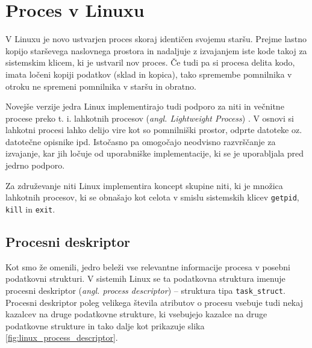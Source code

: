 \documentclass[a4paper,12pt,openright]{book}
\begin{document}
\section{Proces v Linuxu}

V Linuxu je novo ustvarjen proces skoraj identičen svojemu staršu.
Prejme lastno kopijo starševega naslovnega prostora in nadaljuje z izvajanjem iste kode takoj za sistemskim klicem, ki je ustvaril nov proces.
Če tudi pa si procesa delita kodo, imata ločeni kopiji podatkov (sklad in kopica), tako spremembe pomnilnika v otroku ne spremeni pomnilnika v staršu in obratno.

Novejše verzije jedra Linux implementirajo tudi podporo za niti in večnitne procese preko t. i. lahkotnih procesov (\textit{angl. Lightweight Process}) \cite{Bovet_Cesati_2005}.
V osnovi si lahkotni procesi lahko delijo vire kot so pomnilniški prostor, odprte datoteke oz. datotečne opisnike ipd.
Istočasno pa omogočajo neodvisno razvrščanje za izvajanje, kar jih ločuje od uporabniške implementacije, ki se je uporabljala pred jedrno podporo.

Za združevanje niti Linux implementira koncept skupine niti, ki je množica lahkotnih procesov, ki se obnašajo kot celota v smislu sistemskih klicev \texttt{getpid}, \texttt{kill} in \texttt{exit}.

\subsection{Procesni deskriptor}

Kot smo že omenili, jedro beleži vse relevantne informacije procesa v posebni podatkovni strukturi.
V sistemih Linux se ta podatkovna struktura imenuje procesni deskriptor (\textit{angl. process descriptor}) -- struktura tipa \texttt{task\_struct}.
Procesni deskriptor poleg velikega števila atributov o procesu vsebuje tudi nekaj kazalcev na druge podatkovne strukture, ki vsebujejo kazalce na druge podatkovne strukture in tako dalje kot prikazuje slika \ref{fig:linux_process_descriptor}.
\end{document}
